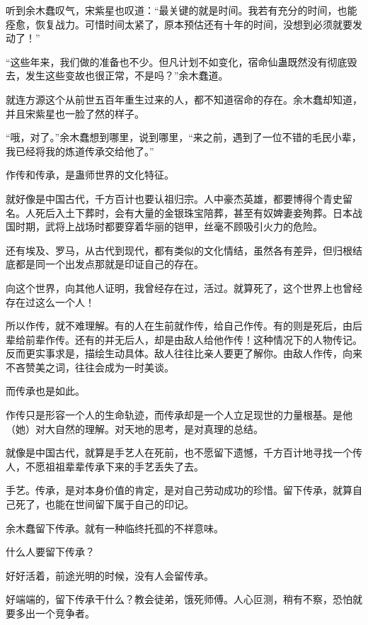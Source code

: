 
\begin{this_body}

听到余木蠢叹气，宋紫星也叹道：“最关键的就是时间。我若有充分的时间，也能痊愈，恢复战力。可惜时间太紧了，原本预估还有十年的时间，没想到必须就要发动了！”

“这些年来，我们做的准备也不少。但凡计划不如变化，宿命仙蛊既然没有彻底毁去，发生这些变故也很正常，不是吗？”余木蠢道。

就连方源这个从前世五百年重生过来的人，都不知道宿命的存在。余木蠢却知道，并且宋紫星也一脸了然的样子。

“哦，对了。”余木蠢想到哪里，说到哪里，“来之前，遇到了一位不错的毛民小辈，我已经将我的炼道传承交给他了。”

作传和传承，是蛊师世界的文化特征。

就好像是中国古代，千方百计也要认祖归宗。人中豪杰英雄，都要博得个青史留名。人死后入土下葬时，会有大量的金银珠宝陪葬，甚至有奴婢妻妾殉葬。日本战国时期，武将上战场时都要穿着华丽的铠甲，丝毫不顾吸引火力的危险。

还有埃及、罗马，从古代到现代，都有类似的文化情结，虽然各有差异，但归根结底都是同一个出发点那就是印证自己的存在。

向这个世界，向其他人证明，我曾经存在过，活过。就算死了，这个世界上也曾经存在过这么一个人！

所以作传，就不难理解。有的人在生前就作传，给自己作传。有的则是死后，由后辈给前辈作传。还有的并无后人，却是由敌人给他作传！这种情况下的人物传记。反而更实事求是，描绘生动具体。敌人往往比亲人要更了解你。由敌人作传，向来不吝赞美之词，往往会成为一时美谈。

而传承也是如此。

作传只是形容一个人的生命轨迹，而传承却是一个人立足现世的力量根基。是他（她）对大自然的理解。对天地的思考，是对真理的总结。

就像是中国古代，就算是手艺人在死前，也不愿留下遗憾，千方百计地寻找一个传人，不愿祖祖辈辈传承下来的手艺丢失了去。

手艺。传承，是对本身价值的肯定，是对自己劳动成功的珍惜。留下传承，就算自己死了，也能在世间留下属于自己的印记。

余木蠢留下传承。就有一种临终托孤的不祥意味。

什么人要留下传承？

好好活着，前途光明的时候，没有人会留传承。

好端端的，留下传承干什么？教会徒弟，饿死师傅。人心叵测，稍有不察，恐怕就要多出一个竞争者。


\end{this_body}
